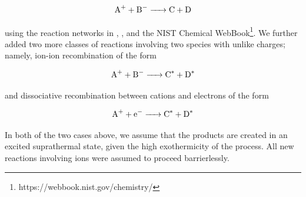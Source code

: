 \documentclass[journal=aesccq,manuscript=article,layout=twocolumn]{achemso}
\begin{document}
\begin{equation}
    \ce{A+ + B- -> C + D}
\end{equation}

\noindent
using the reaction networks in \citet{pastina_effect_2001}, \citet{anicich_index_2003}, and the NIST Chemical WebBook\footnote{https://webbook.nist.gov/chemistry/}. We further added two more classes of reactions involving two species with unlike charges; namely, ion-ion recombination of the form

\begin{equation}
    \ce{A+ + B- -> C^*} + \ce{D^*}
\end{equation}

\noindent
and dissociative recombination between cations and electrons of the form

\begin{equation}
    \ce{A+ + e- -> C^*} + \ce{D^*}
\end{equation}

\noindent
In both of the two cases above, we assume that the products are created in an excited suprathermal state, given the high exothermicity of the process. All new reactions involving ions were assumed to proceed barrierlessly.
\end{document}
